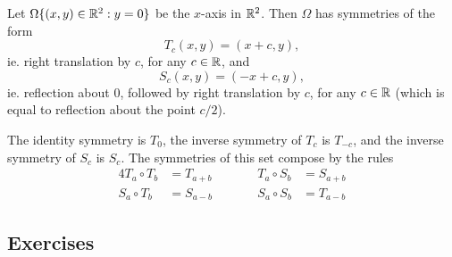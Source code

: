 \begin{example}
  Let $\Omega \{(x,y) \in \mathbb{R}^{2} : y = 0\}$ be the $x$-axis in
  $\mathbb{R}^{2}$. Then $\Omega$ has symmetries of the form
  \[
    T_{c}(x,y) = (x + c,y),
  \]
  ie. right translation by $c$, for any $c \in \mathbb{R}$, and
  \[
    S_{c}(x,y) = (-x + c,y),
  \]
  ie. reflection about $0$, followed by right translation by $c$, for any $c
  \in \mathbb{R}$ (which is equal to reflection about the point $c/2$).
  
  The identity symmetry is $T_{0}$, the inverse symmetry of $T_{c}$ is
  $T_{-c}$, and the inverse symmetry of $S_{c}$ is $S_{c}$. The
  symmetries of this set compose by the rules
  \begin{alignat*}{4}
    T_{a} \circ T_{b} &= T_{a+b} &\qquad&
    T_{a} \circ S_{b} &=  S_{a+b}\\
    S_{a} \circ T_{b} &=  S_{a-b}&&
    S_{a} \circ S_{b} &=  T_{a-b}
  \end{alignat*}
\end{example}

\subsection*{Exercises}

